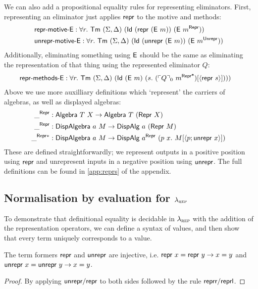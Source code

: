 We can also add a propositional equality rules for representing eliminators.
First, representing an eliminator just applies $\textsf{repr}$ to the motive and methods:
\begin{align*}
&\mta{repr-motive-E} : \forall r.\ \Tm\ (\Sigma, \Delta)\ (\mta{Id}\ (\Mrepr\ (\mta{E}\ m))\ (\mta{E}\ m^\mta{Repr})) \\
&\mta{unrepr-motive-E} : \forall r.\ \Tm\ (\Sigma, \Delta)\ (\mta{Id}\ (\Munrepr\ (\mta{E}\ m))\ (\mta{E}\ m^\mta{Unrepr}))
\end{align*}
Additionally, eliminating something using $\textsf{E}$ should be the same as
eliminating the representation of that thing using the represented eliminator $Q$:
\begin{align*}
&\mta{repr-methods-E} : \forall r.\ \Tm\ (\Sigma, \Delta)\ (\mta{Id}\ (\mta{E}\ m)\ (s.\ (\emb{Q}_0\ m^{\mta{Repr*}})[\Msub{\mta{repr}\ s}])))
\end{align*}
Above we use more auxilliary definitions which `represent' the carriers of
algebras, as well as displayed algebras:
\begin{align*}
\_^{\mta{Repr}} &: \mta{Algebra}\ T\ X \to \mta{Algebra}\ T\ (\mta{Repr}\ X) \\
 \_^{\mta{Repr}} &: \mta{DispAlgebra}\ a\ M \to \mta{DispAlg}\ a\ (\MRepr\ M) \\
 \_^{\mta{Repr}*} &: \mta{DispAlgebra}\ a\ M \to \mta{DispAlg}\ a^{\mta{Repr}}\ (p\ x .\ M[\Msub{p;\mta{unrepr}\ x}])
\end{align*}
These are defined straightforwardly; we represent outputs in a positive position
using $\textsf{repr}$ and unrepresent inputs in a negative position using
$\textsf{unrepr}$. The full definitions can be found in \cref{app:reprs} of the
appendix.

\subsection{Normalisation by evaluation for $\lambda_{\textsc{rep}}$}

To demonstrate that definitional equality is decidable in $\lambda_{\textsc{rep}}$ with the addition
of the representation operators, we can define a syntax of values, and then show that
every term uniquely corresponds to a value.

\begin{lemma}
	The term formers $\textsf{repr}{}$ and $\textsf{unrepr}{}$ are injective, i.e.
	$\textsf{repr}\ x = \textsf{repr}\ y \to x = y$ and $\textsf{unrepr}\ x = \textsf{unrepr}\ y \to x = y$.
	\begin{proof}
				By applying $\textsf{unrepr}/\textsf{repr}$ to both sides
				followed by the rule $\textsf{reprr}/\textsf{reprl}$.
	\end{proof}
\end{lemma}


